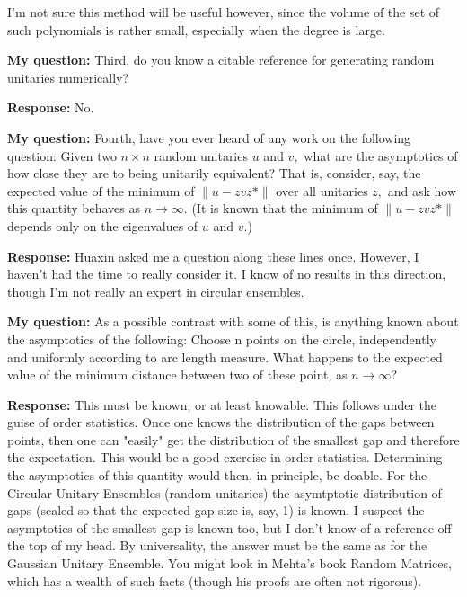 \documentclass[10pt]{amsart}
\theoremstyle{definition}
\begin{document}
I'm not sure this method will be useful however, since the volume of the
set of such polynomials is rather small, especially when the degree is
large.


{\textbf{My question:}}
Third, do you know a citable reference for generating
random unitaries numerically?

{\textbf{Response:}}
No.

{\textbf{My question:}}
Fourth, have you ever heard of any work on the following
question: Given two $n \times n$ random unitaries $u$ and $v,$
what are the
asymptotics of how close they are to being unitarily equivalent?
That is, consider, say, the expected value of the minimum of
$\| u - z v z* \|$ over all unitaries $z,$ and ask how this quantity
behaves as $n \to \infty.$ (It is known that the minimum of
$\| u - z v z* \|$ depends only on the eigenvalues of $u$ and $v.$)

{\textbf{Response:}}
Huaxin asked me a question along these lines once.  However, I haven't
had the time to really consider it.  I know of no results in this
direction, though I'm not really an expert in circular ensembles.

{\textbf{My question:}}
As a possible contrast with some of this, is anything
known about the asymptotics of the following: Choose n points on
the circle, independently and uniformly according to arc length
measure. What happens to the expected value of the minimum distance
between two of these point, as $n \to \infty$?

{\textbf{Response:}}
This must be known, or at least knowable.  This follows under the guise
of order statistics.  Once one knows the distribution of the gaps
between points, then one can "easily" get the distribution of the
smallest gap and therefore the expectation.  This would be a good
exercise in order statistics.  Determining the asymptotics of this
quantity would then, in principle, be doable.  For the Circular Unitary
Ensembles (random unitaries) the asymtptotic distribution of gaps
(scaled so that the expected gap size is, say, 1) is known.  I suspect
the asymptotics of the smallest gap is known too, but I don't know of a
reference off the top of my head.  By universality, the answer must be
the same as for the Gaussian Unitary Ensemble.  You might look in
Mehta's book Random Matrices, which has a wealth of such facts (though
his proofs are often not rigorous).
\end{document}
